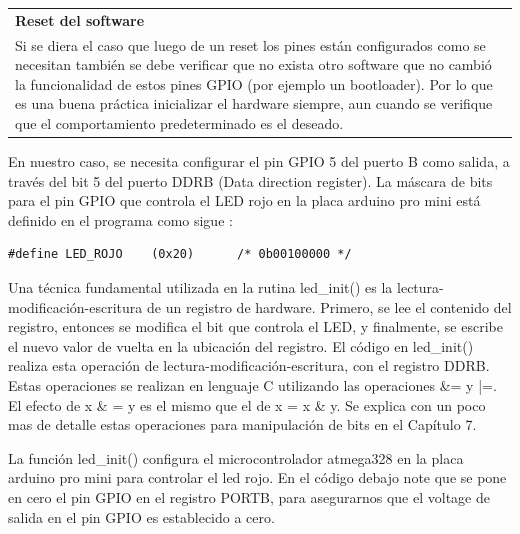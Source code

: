 \documentclass[output=paper, 
colorlinks,
citecolor=brown,
newtxmath
]{langscibook}
\begin{document}
\begin{center}
\begin{tabularx}{\textwidth}{|X|}
\hline
\rowcolor{aliceblue}
\textbf{Reset del software}\\
Si se diera el caso que luego de un reset los pines están configurados
como se necesitan también se debe verificar que no exista otro software 
que no cambió la funcionalidad de estos pines GPIO (por ejemplo un bootloader).
Por lo que es una buena práctica inicializar el hardware siempre, aun
cuando se verifique que el comportamiento predeterminado es el deseado.\\
\hline
\end{tabularx}
\end{center}





En nuestro caso, se necesita configurar el pin GPIO 5 del puerto B como 
salida, a través del bit 5 del puerto DDRB (Data direction register).
La máscara de bits para el pin GPIO que controla el LED rojo en la
placa arduino pro mini está definido en el programa como sigue :

\begin{verbatim}
#define LED_ROJO	(0x20)		/* 0b00100000 */
\end{verbatim}

Una técnica fundamental utilizada en la rutina led\_init() es la lectura-modificación-escritura de un registro de hardware.
Primero, se lee el contenido del registro, entonces se modifica el bit que controla el LED, y finalmente, se escribe el nuevo valor de vuelta en la ubicación
del registro.
El código en led\_init() realiza esta operación de lectura-modificación-escritura,
con el registro DDRB. Estas operaciones se realizan en lenguaje C utilizando
las operaciones \&= y |=. El efecto de x \& = y es el mismo que el de
x = x \& y. Se explica con un poco mas de detalle estas operaciones para manipulación
de bits en el Capítulo 7.

La función led\_init() configura el microcontrolador atmega328 en la placa
arduino pro mini para controlar el led rojo.
En el código debajo note que se pone en cero el pin GPIO en el registro
PORTB, para asegurarnos que el voltage de salida en el pin GPIO es 
establecido a cero.
\end{document}
